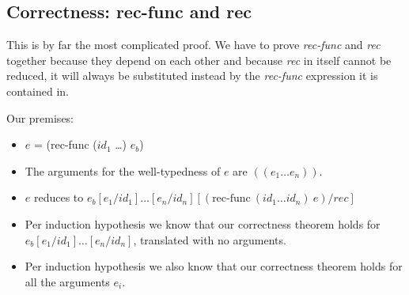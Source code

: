 \documentclass[letterpaper,12pt]{article}
\begin{document}
\subsection{Correctness: rec-func and rec}

This is by far the most complicated proof. We have to prove \textit{rec-func}
and \textit{rec} together because they depend on each other and because
\textit{rec} in itself cannot be reduced, it will always be substituted
instead by the \textit{rec-func} expression it is contained in.

Our premises:
\begin{itemize}
	\item $e$ = (rec-func ($id_1$ \dots) $e_b$)
	\item The arguments for the well-typedness of $e$ are $((e_1 \dots e_n))$.
	\item $e$ reduces to 
		$e_b[e_1 / id_1]\dots[e_n / id_n][(\text{rec-func}\:(id_1 \dots id_n)\:e) / rec]$
	\item Per induction hypothesis we know that our correctness theorem
		holds for \\
		$e_b[e_1 / id_1]\dots[e_n / id_n]$, translated with no arguments.
	\item Per induction hypothesis we also know that our correctness theorem
		holds for all the arguments $e_i$.
\end{itemize}
\end{document}
